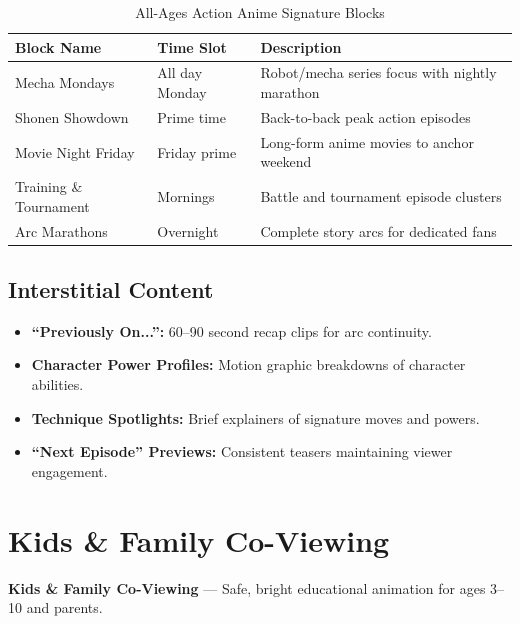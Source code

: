 \documentclass[12pt,letterpaper,twoside]{report}
\begin{document}
\begin{table}[H]
\centering
\caption{All-Ages Action Anime Signature Blocks}
\label{tab:anime-blocks}
\begin{tabular}{@{}L{4cm}L{2.5cm}L{7cm}@{}}
\toprule
\textbf{Block Name} & \textbf{Time Slot} & \textbf{Description} \\
\midrule
Mecha Mondays & All day Monday & Robot/mecha series focus with nightly marathon \\
\addlinespace
Shonen Showdown & Prime time & Back-to-back peak action episodes \\
\addlinespace
Movie Night Friday & Friday prime & Long-form anime movies to anchor weekend \\
\addlinespace
Training \& Tournament & Mornings & Battle and tournament episode clusters \\
\addlinespace
Arc Marathons & Overnight & Complete story arcs for dedicated fans \\
\bottomrule
\end{tabular}
\end{table}

\subsection{Interstitial Content}

\begin{itemize}[leftmargin=1.5cm]
    \item \textbf{``Previously On...'':} 60--90 second recap clips for arc continuity.
    \item \textbf{Character Power Profiles:} Motion graphic breakdowns of character abilities.
    \item \textbf{Technique Spotlights:} Brief explainers of signature moves and powers.
    \item \textbf{``Next Episode'' Previews:} Consistent teasers maintaining viewer engagement.
\end{itemize}

\section{Kids \& Family Co-Viewing}
\label{sec:kids}

\begin{channelbox}[kidspink]
\textbf{Kids \& Family Co-Viewing} --- Safe, bright educational animation for ages 3--10 and parents.
\end{channelbox}
\end{document}
